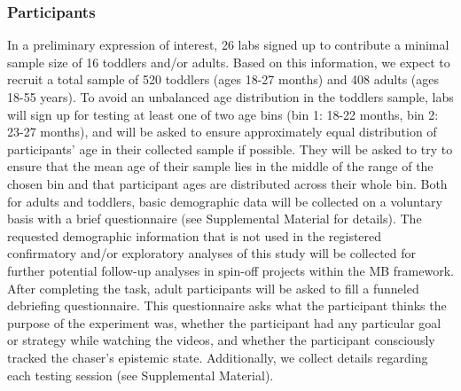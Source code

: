 \documentclass[
  english,
  man,floatsintext]{apa6}
\begin{document}
\hypertarget{participants}{%
\subsubsection{Participants}\label{participants}}

In a preliminary expression of interest, 26 labs signed up to contribute a minimal sample size of 16 toddlers and/or adults. Based on this information, we expect to recruit a total sample of 520 toddlers (ages 18-27 months) and 408 adults (ages 18-55 years). To avoid an unbalanced age distribution in the toddlers sample, labs will sign up for testing at least one of two age bins (bin 1: 18-22 months, bin 2: 23-27 months), and will be asked to ensure approximately equal distribution of participants' age in their collected sample if possible. They will be asked to try to ensure that the mean age of their sample lies in the middle of the range of the chosen bin and that participant ages are distributed across their whole bin. Both for adults and toddlers, basic demographic data will be collected on a voluntary basis with a brief questionnaire (see Supplemental Material for details). The requested demographic information that is not used in the registered confirmatory and/or exploratory analyses of this study will be collected for further potential follow-up analyses in spin-off projects within the MB framework.
After completing the task, adult participants will be asked to fill a funneled debriefing questionnaire. This questionnaire asks what the participant thinks the purpose of the experiment was, whether the participant had any particular goal or strategy while watching the videos, and whether the participant consciously tracked the chaser's epistemic state. Additionally, we collect details regarding each testing session (see Supplemental Material).
\end{document}
